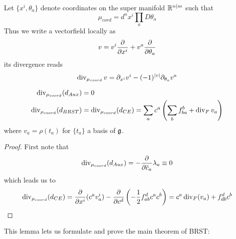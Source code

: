 \begin{rem}
  \begin{lem}
    Let $\{x^i, \theta_a\}$ denote coordinates on the super manifold $\mathbb{R}^{n|m}$ such that
    \begin{equation}
      \mu_{cord} = d^n x^i \prod_a D\theta_a
    \end{equation}
    Thus we write a vectorfield locally as
    \begin{equation}
      v = v^i \frac{\partial }{\partial x^i} + v^a \frac{\partial }{\partial \theta_a}
    \end{equation}
    its divergence reads
    \begin{equation}
      \operatorname{div}_{\mu_{coord}} v = \partial_{x^i} v^i - (-1)^{|v|} \partial_{\theta_a} v^a
    \end{equation}
  \end{lem}
\end{rem}

\begin{lem}
  \begin{align*}
    \operatorname{div}_{\mu_{coord}} (d_{Aux}) &= 0 \\
    \operatorname{div}_{\mu_{coord}} (d_{BRST}) &= \operatorname{div}_{\mu_{coord}} (d_{CE}) = \sum_a c^a \left( \sum_b f^b_{ba} + \operatorname{div}_F v_a \right)
  \end{align*}
  where $v_a = \rho(t_a)$ for $\{t_a\}$ a basis of $\mathfrak{g}$.
\begin{proof}
  First note that
  $$ \operatorname{div}_{\mu_{coord}} (d_{Aux}) = - \frac{\partial }{\partial \overline{c}_a} \lambda_a \equiv 0 $$
  which leads us to
  $$ \operatorname{div}_{\mu_{coord}} (d_{CE}) = \frac{\partial }{\partial x^i} (c^a v_a^i) - \frac{\partial }{\partial c^d} \left(- \frac{1}{2} f^d_{ab}c^a c^b\right) = c^a \operatorname{div}_F (v_a) + f^d_{db}c^b $$
\end{proof}
\end{lem}

This lemma lets us formulate and prove the main theorem of BRST:

